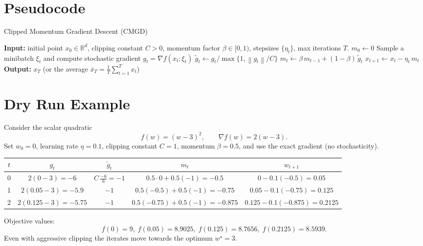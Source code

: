 \documentclass{article}
\newcommand{\norm}[1]{\left\lVert #1 \right\rVert}
\newcommand{\R}{\mathbb{R}}
\begin{document}
\section*{Pseudocode}
\begin{algorithm}[H]
\caption{Clipped Momentum Gradient Descent (CMGD)}
\begin{algorithmic}[1]
\STATE \textbf{Input:} initial point $x_0\in\R^d$, clipping constant $C>0$, 
momentum factor $\beta\in[0,1)$, stepsizes $\{\eta_t\}$, max iterations $T$.
\STATE $m_0\gets 0$
    \STATE Sample a minibatch $\xi_t$ and compute stochastic gradient $g_t=\nabla f(x_t;\xi_t)$
    \STATE $\tilde g_t \gets g_t / \max\{1,\norm{g_t}/C\}$ \hfill{}
    \STATE $m_t \gets \beta\, m_{t-1} + (1-\beta)\,\tilde g_t$ \hfill{}
    \STATE $x_{t+1} \gets x_t - \eta_t\, m_t$ \hfill{}
\ENDFOR
\STATE \textbf{Output:} $x_T$ (or the average $\bar x_T=\frac1T\sum_{t=1}^{T}x_t$)
\end{algorithmic}
\end{algorithm}

\section*{Dry Run Example}
Consider the scalar quadratic
\[
f(w) = (w-3)^2,\qquad \nabla f(w)=2(w-3).
\]
Set $w_0=0$, learning rate $\eta=0.1$, clipping constant $C=1$, momentum $\beta=0.5$,
and use the exact gradient (no stochasticity).  

\begin{center}
\begin{tabular}{c|c|c|c|c}
$t$ & $g_t$ & $\tilde g_t$ & $m_t$ & $w_{t+1}$ \\ \hline
0 & $2(0-3)=-6$ & $C\,\frac{-6}{6}=-1$ & $0.5\cdot0+0.5(-1)=-0.5$ & $0-0.1(-0.5)=0.05$ \\[4pt]
1 & $2(0.05-3)=-5.9$ & $-1$ & $0.5(-0.5)+0.5(-1)=-0.75$ & $0.05-0.1(-0.75)=0.125$ \\[4pt]
2 & $2(0.125-3)=-5.75$ & $-1$ & $0.5(-0.75)+0.5(-1)=-0.875$ & $0.125-0.1(-0.875)=0.2125$
\end{tabular}
\end{center}
Objective values:
\[
f(0)=9,\; f(0.05)=8.9025,\; f(0.125)=8.7656,\; f(0.2125)=8.5939.
\]
Even with aggressive clipping the iterates move towards the optimum $w^\star=3$.

\newpage
\end{document}
